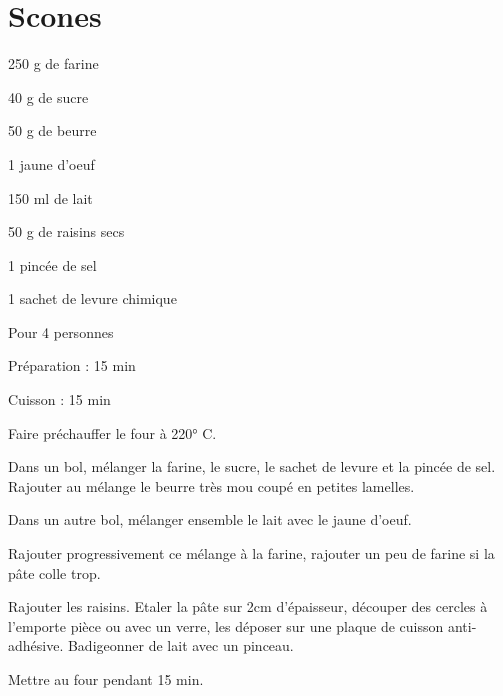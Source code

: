 \section[\normalsize{Scones}]{Scones}

\begin{ingredients}
\item 250 g de farine
\item 40 g de sucre
\item 50 g de beurre
\item 1 jaune d'oeuf
\item 150 ml de lait
\item 50 g de raisins secs
\item 1 pinc\'ee de sel
\item 1 sachet de levure chimique
\end{ingredients}
\begin{infos}
\item Pour 4 personnes
\item Préparation : 15 min
\item Cuisson : 15 min
\end{infos}
\begin{etapes}
\item Faire pr\'echauffer le four \`a 220° C.
\item Dans un bol, m\'elanger la farine, le sucre, le sachet de levure et la pinc\'ee de sel. Rajouter au m\'elange le beurre tr\`es mou coup\'e en petites lamelles.
\item Dans un autre bol, m\'elanger ensemble le lait avec le jaune d'oeuf.
\item Rajouter progressivement ce m\'elange \`a la farine, rajouter un peu de farine si la p\^ate colle trop.
\item Rajouter les raisins. Etaler la p\^ate sur 2cm d'\'epaisseur, d\'ecouper des cercles \`a l'emporte pi\`ece ou avec un verre, les d\'eposer sur une plaque de cuisson anti-adh\'esive. Badigeonner de lait avec un pinceau.  
\item Mettre au four pendant 15 min.
\end{etapes}
\begin{conseils}
\end{conseils}
